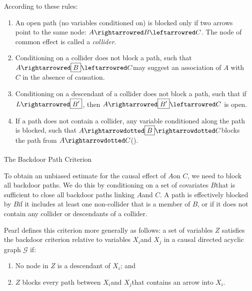 \documentclass[
  single column]{article}
\makeatletter
\let\oldparagraph\paragraph
\renewcommand{\paragraph}{
    \@ifstar
      \xxxParagraphStar
      \xxxParagraphNoStar
  }
\newcommand{\xxxParagraphStar}[1]{\oldparagraph*{#1}\mbox{}}
\newcommand{\xxxParagraphNoStar}[1]{\oldparagraph{#1}\mbox{}}
\providecommand{\tightlist}{%
  \setlength{\itemsep}{0pt}\setlength{\parskip}{0pt}}\usepackage{longtable,booktabs,array}
\makeatother
\begin{document}
According to these rules:

\begin{enumerate}
\def\labelenumi{\arabic{enumi}.}
\tightlist
\item
  An open path (no variables conditioned on) is blocked only if two
  arrows point to the same node: \(A \rightarrowred B \leftarrowred C\).
  The node of common effect is called a \emph{collider}.
\item
  Conditioning on a collider does not block a path, such that
  \(A \rightarrowred \boxed{B} \leftarrowred C\)may suggest an
  association of \(A\) with \(C\) in the absence of causation.
\item
  Conditioning on a descendant of a collider does not block a path, such
  that if \(L \rightarrowred \boxed{B'}\), then
  \(A \rightarrowred \boxed{B'} \leftarrowred C\) is open.
\item
  If a path does not contain a collider, any variable conditioned along
  the path is blocked, such that
  \(A \rightarrowdotted \boxed{B} \rightarrowdotted C\)blocks the path
  from \(A \rightarrowdotted C\)().
\end{enumerate}

\paragraph{The Backdoor Path
Criterion}\label{the-backdoor-path-criterion}

To obtain an unbiased estimate for the causal effect of \(A\)on \(C\),
we need to block all backdoor paths. We do this by conditioning on a set
of covariates \(B\)that is sufficient to close all backdoor paths
linking \(A\)and \(C\). A path is effectively blocked by \(B\)if it
includes at least one non-collider that is a member of \(B\), or if it
does not contain any collider or descendants of a collider.

Pearl defines this criterion more generally as follows: a set of
variables \(Z\) satisfies the backdoor criterion relative to variables
\(X_i\)and \(X_j\) in a causal directed acyclic graph \(\mathcal{G}\)
if:

\begin{enumerate}
\def\labelenumi{\arabic{enumi}.}
\tightlist
\item
  No node in \(Z\) is a descendant of \(X_i\); and
\item
  \(Z\) blocks every path between \(X_i\)and \(X_j\)that contains an
  arrow into \(X_i\).
\end{enumerate}
\end{document}
